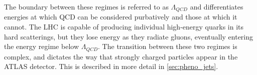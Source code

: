 The boundary between these regimes is referred to as $\Lambda_{QCD}$ and differentiates energies at which \ac{QCD} can be considered purbatively and those at which it cannot. The \ac{LHC} is capable of producing individual high-energy quarks in its hard scatterings, but they lose energy as they radiate gluons, eventually entering the energy regime below $\Lambda_{QCD}$. The transition between these two regimes is complex, and dictates the way that strongly charged particles appear in the ATLAS detector. This is described in more detail in \autoref{sec:pheno_jets}.









